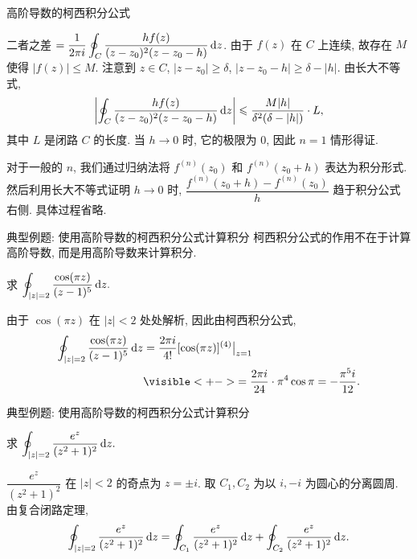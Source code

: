 \begin{frame}{高阶导数的柯西积分公式}
\begin{proofe}
\indent
二者之差 $=\displaystyle\frac1{2\pi i}\oint_C\frac{h f(z)}{(z-z_0)^2(z-z_0-h)}\,\mathrm{d} z$.
\onslide<+->
由于 $f(z)$ 在 $C$ 上连续, 故存在 $M$ 使得 $|f(z)|\le M$.
\onslide<+->
注意到 $z\in C$, $|z-z_0|\ge \delta$, $|z-z_0-h|\ge\delta-|h|$.
\onslide<+->
由长大不等式,
\[\left|\oint_C\frac{h f(z)}{(z-z_0)^2(z-z_0-h)}\,\mathrm{d} z\right|\leqslant\frac{M|h|}{\delta^2(\delta-|h|)}\cdot L,\]
其中 $L$ 是闭路 $C$ 的长度.
\onslide<+->
当 $h\to0$ 时, 它的极限为 $0$, 因此 $n=1$ 情形得证.

\indent
\onslide<+->
对于一般的 $n$, 我们通过归纳法将 $f^{(n)}(z_0)$ 和 $f^{(n)}(z_0+h)$ 表达为积分形式.
\onslide<+->
然后利用长大不等式证明 $h\to 0$ 时, $\dfrac{f^{(n)}(z_0+h)-f^{(n)}(z_0)}h$ 趋于积分公式右侧.
\onslide<+->
具体过程省略.
\end{proofe}
\end{frame}


\begin{frame}{典型例题: 使用高阶导数的柯西积分公式计算积分}
\onslide<+->
\alert{柯西积分公式的作用不在于计算高阶导数, 而是用高阶导数来计算积分.}
\begin{example}
求 $\displaystyle\oint_{|z|=2}\frac{\cos(\pi z)}{(z-1)^5}\,\mathrm{d} z.$
\end{example}
\begin{solution}
由于 $\cos(\pi z)$ 在 $|z|<2$ 处处解析,
\onslide<+->
因此由柯西积分公式,
\begin{align*}
\oint_{|z|=2}\frac{\cos(\pi z)}{(z-1)^5}\diff z
&=\frac{2\pi i}{4!}[\cos(\pi z)]^{(4)}\big|_{z=1}\\
&\visible<+->{=\frac{2\pi i}{24}\cdot \pi^4\cos \pi=-\frac{\pi^5 i}{12}.}
\end{align*}
\end{solution}
\end{frame}


\begin{frame}{典型例题: 使用高阶导数的柯西积分公式计算积分}
\begin{example}
求 $\displaystyle\oint_{|z|=2}\frac{e^z}{(z^2+1)^2}\,\mathrm{d} z.$
\end{example}
\begin{solution}
$\dfrac{e^z}{(z^2+1)^2}$ 在 $|z|<2$ 的奇点为 $z=\pm i$.
\onslide<+->
取 $C_1,C_2$ 为以 $i,-i$ 为圆心的分离圆周.
\onslide<+->
由复合闭路定理,
\[\oint_{|z|=2}\frac{e^z}{(z^2+1)^2}\,\mathrm{d} z
=\oint_{C_1}\frac{e^z}{(z^2+1)^2}\,\mathrm{d} z
+\oint_{C_2}\frac{e^z}{(z^2+1)^2}\,\mathrm{d} z.\]
\end{solution}
\end{frame}


